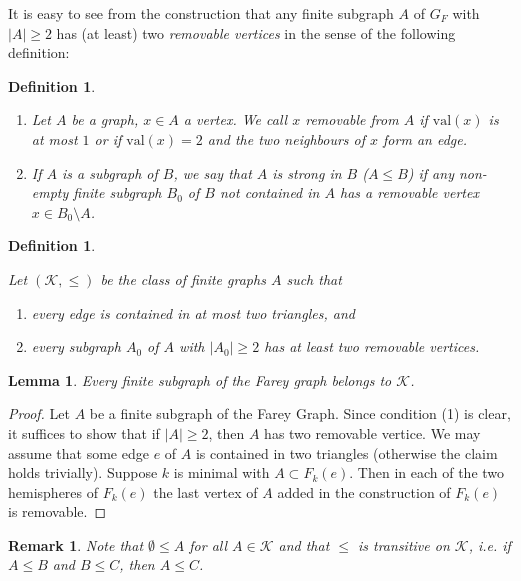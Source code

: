 \documentclass[10pt,a4paper]{amsart}
\newcommand{\K}{\mathcal{K}}
\newcommand{\val}{\mathrm{val}}
\newtheorem{definition}[defi]{Definition}
\newtheorem{lemma}[defi]{Lemma}
\newtheorem{remark}[defi]{Remark}
\begin{document}
  

It is easy to see from the construction that any finite subgraph $A$ of $G_F$ with $|A|\geq 2$ has (at least) two \emph{removable vertices}
in the sense of the following definition:

\begin{definition}\label{def:removable}
\begin{enumerate}
    \item 
    Let $A$ be a graph, $x\in A$ a vertex. We call $x$ removable from $A$ if $\val(x)$ is at most $1$ or if $\val(x)=2$ and the two neighbours of $x$ form an edge.

    \item If $A$ is a subgraph of $B$, we say that $A$ is strong in $B$ ($A\leq B$) if any non-empty finite subgraph $B_0$ of $B$ not contained in $A$ has a removable vertex $x\in B_0\setminus A$. 
    \end{enumerate}
\end{definition}



\begin{definition}\label{def:K}
    
Let $(\K,\leq)$ be the class of finite graphs $A$ such that
\begin{enumerate}
    \item every edge is contained in at most two triangles, and
    \item every subgraph $A_0$ of $A$ with $|A_0|\geq 2$ has at least two removable vertices.
\end{enumerate}
\end{definition}


\begin{lemma}\label{lem:FG in K}
Every finite subgraph of the Farey graph belongs to $\K$.
\end{lemma}
\begin{proof}
Let $A$ be a finite subgraph of the Farey Graph. Since  condition (1) is clear, it suffices to show that if $|A|\geq 2$, then $A$ has two removable vertice. We may assume that some edge $e$ of $A$ is contained in two triangles (otherwise the claim holds trivially). Suppose $k$ is minimal with $A\subset F_k(e)$. Then in each of the two hemispheres of $F_k(e)$ the last vertex of $A$ added in the construction of $F_k(e)$ is removable.
\end{proof}

\begin{remark} Note that $\emptyset\leq A$ for all $A\in \K$
and that $\leq$ is transitive on $\K$, i.e. if $A\leq B$ and $B\leq C$, then $A\leq C$.
\end{remark} 
\end{document}
